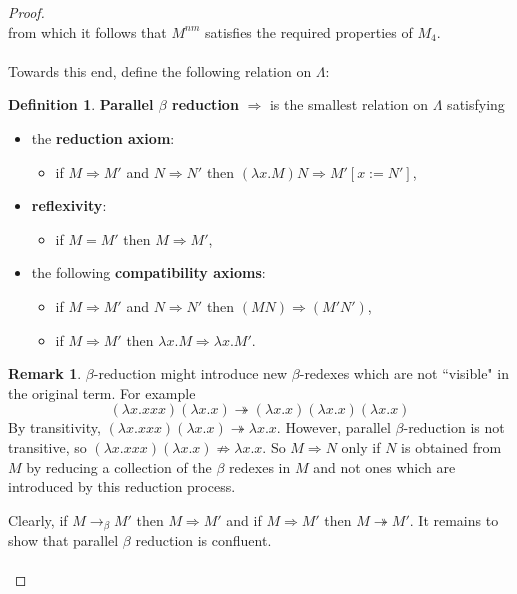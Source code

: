 \documentclass[12pt]{article}
\theoremstyle{plane}
\theoremstyle{definition}
\newtheorem{defn}{Definition}
\newtheorem{remark}{Remark}
\begin{document}
\begin{proof}
\[		\]
		from which it follows that $M^{nm}$ satisfies the required properties of $M_4$.\\\\
		Towards this end, define the following relation on $\Lambda$:
		\begin{defn}
			\textbf{Parallel $\beta$ reduction} $\Rightarrow$ is the smallest relation on $\Lambda$ satisfying
			\begin{itemize}
				\item the \textbf{reduction axiom}:
				\begin{itemize}
					\item if $M \Rightarrow M'$ and $N \Rightarrow N'$ then $(\lambda x.M)N \Rightarrow M'[x := N']$,
				\end{itemize}
				\item \textbf{reflexivity}:
				\begin{itemize}
					\item if $M = M'$ then $M \Rightarrow M'$,
				\end{itemize}
				\item the following \textbf{compatibility axioms}:
				\begin{itemize}
					\item if $M \Rightarrow M'$ and $N \Rightarrow N'$ then $(MN) \Rightarrow (M'N')$,
					\item if $M \Rightarrow M'$ then $\lambda x. M \Rightarrow \lambda x. M'$.
				\end{itemize}
			\end{itemize}
		\end{defn}
		\begin{remark}
			$\beta$-reduction might introduce new $\beta$-redexes which are not ``visible" in the original term. For example
			\[(\lambda x. xxx)(\lambda x.x) \twoheadrightarrow (\lambda x.x)(\lambda x.x)(\lambda x.x)\]
			By transitivity, $(\lambda x.xxx)(\lambda x.x) \twoheadrightarrow \lambda x.x$. However, parallel $\beta$-reduction is not transitive, so $(\lambda x.xxx)(\lambda x.x)\not\Rightarrow \lambda x.x$. So $M \Rightarrow N$ only if $N$ is obtained from $M$ by reducing a collection of the $\beta$ redexes in $M$ and not ones which are introduced by this reduction process.
		\end{remark}
		Clearly, if $M \to_\beta M'$ then $M \Rightarrow M'$ and if $M \Rightarrow M'$ then $M \twoheadrightarrow M'$. It remains to show that parallel $\beta$ reduction is confluent.\\\\

\end{proof}
\end{document}
